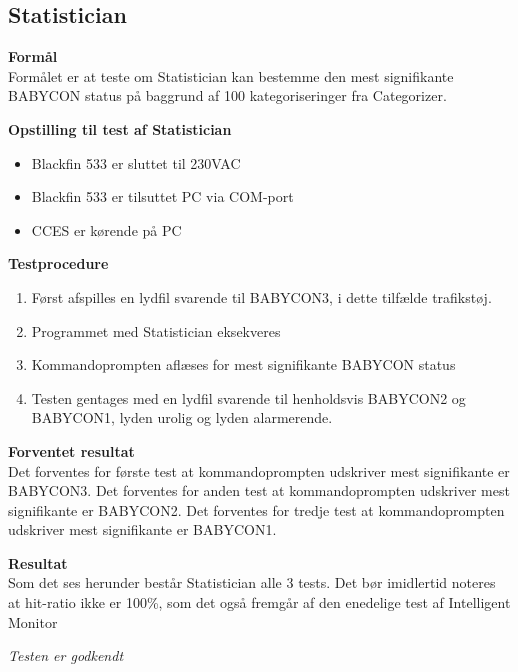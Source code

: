 \subsection*{Statistician}

\textbf{Formål} \\
Formålet er at teste om Statistician kan bestemme den mest signifikante BABYCON status på baggrund af 100 kategoriseringer fra Categorizer.

\textbf{Opstilling til test af Statistician}

\begin{itemize}
	\item Blackfin 533 er sluttet til 230VAC
	\item Blackfin 533 er tilsuttet PC via COM-port
	\item CCES er kørende på PC
\end{itemize}

\textbf{Testprocedure}
\begin{enumerate}
	\item Først afspilles en lydfil svarende til BABYCON3, i dette tilfælde trafikstøj.
	\item Programmet med Statistician eksekveres 
	\item Kommandoprompten aflæses for mest signifikante BABYCON status
	\item Testen gentages med en lydfil svarende til henholdsvis BABYCON2 og BABYCON1, lyden urolig og lyden alarmerende. 
\end{enumerate}

\textbf{Forventet resultat} \\
Det forventes for første test at kommandoprompten udskriver mest signifikante er BABYCON3.
Det forventes for anden test at kommandoprompten udskriver mest signifikante er BABYCON2.
Det forventes for tredje test at kommandoprompten udskriver mest signifikante er BABYCON1. 

\textbf{Resultat} \\
Som det ses herunder består Statistician alle 3 tests. Det bør imidlertid noteres at hit-ratio ikke er 100\%, som det også fremgår af den enedelige test af Intelligent Monitor


\textit{Testen er godkendt}